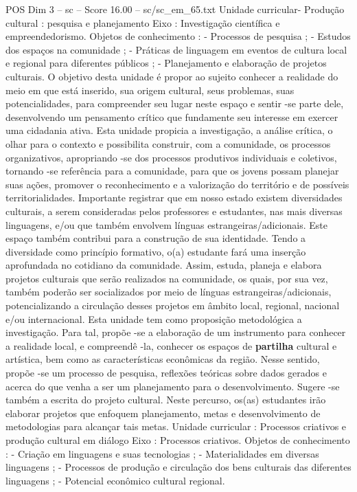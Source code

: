 \begin{textsample}{POS Dim 3 – sc – Score 16.00 – sc/sc\_em\_65.txt}
Unidade curricular- Produção cultural : pesquisa e planejamento Eixo : Investigação científica e empreendedorismo.
Objetos de conhecimento : - Processos de pesquisa ; - Estudos dos espaços na comunidade ; - Práticas de linguagem em eventos de cultura local e regional para diferentes públicos ; - Planejamento e elaboração de projetos culturais.
O objetivo desta unidade é propor ao sujeito conhecer a realidade do meio em que está inserido, sua origem cultural, seus problemas, suas potencialidades, para compreender seu lugar neste espaço e sentir -se parte dele, desenvolvendo um pensamento crítico que fundamente seu interesse em exercer uma cidadania ativa.
Esta unidade propicia a investigação, a análise crítica, o olhar para o contexto e possibilita construir, com a comunidade, os processos organizativos, apropriando -se dos processos produtivos individuais e coletivos, tornando -se referência para a comunidade, para que os jovens possam planejar suas ações, promover o reconhecimento e a valorização do território e de possíveis territorialidades.
Importante registrar que em nosso estado existem diversidades culturais, a serem consideradas pelos professores e estudantes, nas mais diversas linguagens, e/ou que também envolvem línguas estrangeiras/adicionais.
Este espaço também contribui para a construção de sua identidade.
Tendo a diversidade como princípio formativo, o(a) estudante fará uma inserção aprofundada no cotidiano da comunidade.
Assim, estuda, planeja e elabora projetos culturais que serão realizados na comunidade, os quais, por sua vez, também poderão ser socializados por meio de línguas estrangeiras/adicionais, potencializando a circulação desses projetos em âmbito local, regional, nacional e/ou internacional.
Esta unidade tem como proposição metodológica a investigação.
Para tal, propõe -se a elaboração de um instrumento para conhecer a realidade local, e compreendê -la, conhecer os espaços de \textbf{partilha} cultural e artística, bem como as características econômicas da região.
Nesse sentido, propõe -se um processo de pesquisa, reflexões teóricas sobre dados gerados e acerca do que venha a ser um planejamento para o desenvolvimento.
Sugere -se também a escrita do projeto cultural.
Neste percurso, os(as) estudantes irão elaborar projetos que enfoquem planejamento, metas e desenvolvimento de metodologias para alcançar tais metas.
Unidade curricular : Processos criativos e produção cultural em diálogo Eixo : Processos criativos.
Objetos de conhecimento : - Criação em linguagens e suas tecnologias ; - Materialidades em diversas linguagens ; - Processos de produção e circulação dos bens culturais das diferentes linguagens ; - Potencial econômico cultural regional.

\end{textsample}
